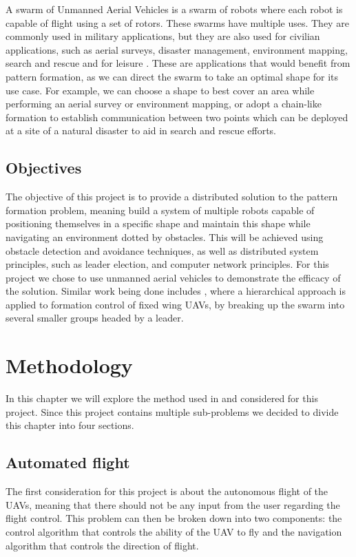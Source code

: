 A swarm of Unmanned Aerial Vehicles is a swarm of robots where each robot is capable of flight using
a set of rotors. These swarms have multiple uses. They are commonly used in military applications, but
they are also used for civilian applications, such as aerial surveys, disaster management, environment
mapping, search and rescue and for leisure \autocite{TA19}. These are applications that would benefit
from pattern formation, as we can direct the swarm to take an optimal shape for its use case. For 
example, we can choose a shape to best cover an area while performing an aerial survey or environment
mapping, or adopt a chain-like formation to establish communication between two points \autocite{MS20}
which can be deployed at a site of a natural disaster to aid in search and rescue efforts.


\section{Objectives}

The objective of this project is to provide a distributed solution to the pattern formation problem, meaning
build a system of multiple robots capable of positioning themselves in a specific shape and maintain this
shape while navigating an environment dotted by obstacles. This will be achieved using obstacle detection
and avoidance techniques, as well as distributed system principles, such as leader election, and computer
network principles. For this project we chose to use unmanned aerial vehicles to demonstrate the efficacy
of the solution. Similar work being done includes \autocite{HC21}, where a hierarchical approach is applied
to formation control of fixed wing UAVs, by breaking up the swarm into several smaller groups headed by a 
leader.


\chapter{Methodology}

In this chapter we will explore the method used in and considered for this project. Since this project
contains multiple sub-problems we decided to divide this chapter into four sections.

\section{Automated flight}

The first consideration for this project is about the autonomous flight of the UAVs, meaning that there 
should not be any input from the user regarding the flight control. This problem can then be broken down
into two components: the control algorithm that controls the ability of the UAV to fly and the navigation
algorithm that controls the direction of flight.

